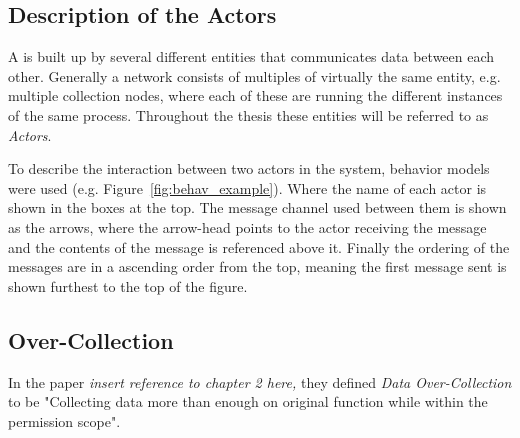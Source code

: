 

\subsection{Description of the Actors}


A \wsn is built up by several different entities that communicates data between each other. Generally a network consists of multiples of virtually the same entity, e.g. multiple collection nodes, where each of these are running the different instances of the same process. Throughout the thesis these entities will be referred to as \textit{Actors}.

To describe the interaction between two actors in the system, behavior models were used (e.g. Figure~\ref{fig:behav_example}). Where the name of each actor is shown in the boxes at the top. The message channel used between them is shown as the arrows, where the arrow-head points to the actor receiving the message and the contents of the message is referenced above it. Finally the ordering of the messages are in a ascending order from the top, meaning the first message sent is shown furthest to the top of the figure.



\subsection{Over-Collection}


In the paper \textit{insert reference to chapter 2 here,} they defined \textit{Data Over-Collection} to be "Collecting data more than enough on original function while within the permission scope". 



